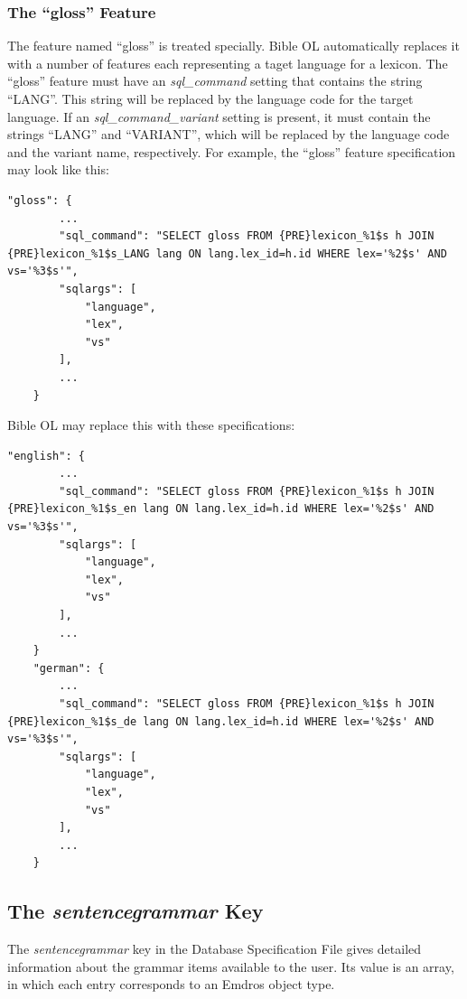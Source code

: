 \documentclass[11pt,oneside,a4paper]{memoir}
\begin{document}
\subsubsection{The ``gloss'' Feature}\label{sec-gloss-feature}

The feature named ``gloss'' is treated specially. Bible OL automatically replaces it with a number
of features each representing a taget language for a lexicon. The ``gloss'' feature must have
an \emph{sql\_command} setting that contains the string ``LANG''. This string will be replaced by
the language code for the target language. If an \emph{sql\_command\_variant} setting is present, it must
contain the strings ``LANG'' and ``VARIANT'', which will be replaced by the language code and the
variant name, respectively. For example, the ``gloss'' feature specification may look
like this:

\begin{lstlisting}[escapechar=\#]
    "gloss": {
        ...
        "sql_command": "SELECT gloss FROM {PRE}lexicon_%1$s h JOIN {PRE}lexicon_%1$s_LANG lang ON lang.lex_id=h.id WHERE lex='%2$s' AND vs='%3$s'",
        "sqlargs": [
            "language",
            "lex",
            "vs"
        ],
        ...
    }
\end{lstlisting}

Bible OL may replace this with these specifications:

\begin{lstlisting}[escapechar=\#]
    "english": {
        ...
        "sql_command": "SELECT gloss FROM {PRE}lexicon_%1$s h JOIN {PRE}lexicon_%1$s_en lang ON lang.lex_id=h.id WHERE lex='%2$s' AND vs='%3$s'",
        "sqlargs": [
            "language",
            "lex",
            "vs"
        ],
        ...
    }
    "german": {
        ...
        "sql_command": "SELECT gloss FROM {PRE}lexicon_%1$s h JOIN {PRE}lexicon_%1$s_de lang ON lang.lex_id=h.id WHERE lex='%2$s' AND vs='%3$s'",
        "sqlargs": [
            "language",
            "lex",
            "vs"
        ],
        ...
    }
\end{lstlisting}



\subsection{The \emph{sentencegrammar} Key}\label{sentencegrammar}

The \emph{sentencegrammar} key in the Database Specification File gives detailed information about
the grammar items available to the user. Its value is an array, in which each entry
corresponds to an Emdros object type.
\end{document}
